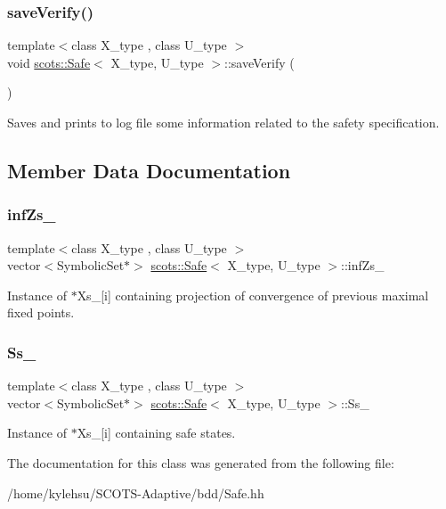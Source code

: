 \subsubsection{\texorpdfstring{save\+Verify()}{saveVerify()}}
{\footnotesize\ttfamily template$<$class X\+\_\+type , class U\+\_\+type $>$ \\
void \hyperlink{classscots_1_1Safe}{scots\+::\+Safe}$<$ X\+\_\+type, U\+\_\+type $>$\+::save\+Verify (\begin{DoxyParamCaption}{ }\end{DoxyParamCaption})\hspace{0.3cm}{\ttfamily [inline]}}

Saves and prints to log file some information related to the safety specification. 

\subsection{Member Data Documentation}
\mbox{\label{classscots_1_1Safe_a30e38b9a75a8bf34efb2512465ea9468}} 
\subsubsection{\texorpdfstring{inf\+Zs\+\_\+}{infZs\_}}
{\footnotesize\ttfamily template$<$class X\+\_\+type , class U\+\_\+type $>$ \\
vector$<$Symbolic\+Set$\ast$$>$ \hyperlink{classscots_1_1Safe}{scots\+::\+Safe}$<$ X\+\_\+type, U\+\_\+type $>$\+::inf\+Zs\+\_\+}

Instance of $\ast$\+Xs\+\_\+\mbox{[}i\mbox{]} containing projection of convergence of previous maximal fixed points. \mbox{\label{classscots_1_1Safe_a4c272a1e134f26e88c74a08c2703d934}} 
\subsubsection{\texorpdfstring{Ss\+\_\+}{Ss\_}}
{\footnotesize\ttfamily template$<$class X\+\_\+type , class U\+\_\+type $>$ \\
vector$<$Symbolic\+Set$\ast$$>$ \hyperlink{classscots_1_1Safe}{scots\+::\+Safe}$<$ X\+\_\+type, U\+\_\+type $>$\+::Ss\+\_\+}

Instance of $\ast$\+Xs\+\_\+\mbox{[}i\mbox{]} containing safe states. 

The documentation for this class was generated from the following file\+:\begin{DoxyCompactItemize}
\item 
/home/kylehsu/\+S\+C\+O\+T\+S-\/\+Adaptive/bdd/Safe.\+hh\end{DoxyCompactItemize}
